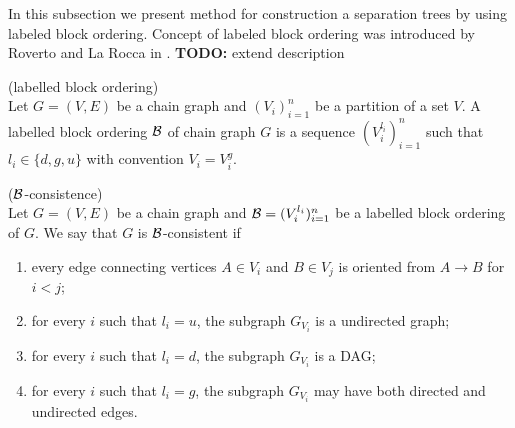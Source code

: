 %
%


In this subsection we present method for construction a separation trees by using labeled block ordering.
Concept of labeled block ordering was introduced by Roverto and La Rocca in \cite{LBO}.  
\textbf{TODO:} extend description  


\begin{defi} (labelled block ordering) \\ 
	Let $G = (V, E)$ be a chain graph and $(V_i)_{i = 1}^{n}$ be a partition of a set $V$. A labelled block ordering 
	$\mathcal{B}$ of chain graph $G$ is a sequence $(V_i^{l_i})_{i = 1}^{n}$ such that $l_i \in \{d, g, u\}$ with convention $V_i = V_i^{g}$.
\end{defi}


\begin{defi} ($\mathcal{B}$-consistence) \\ 
	Let $G = (V, E)$ be a chain graph and $\mathcal{B} = (V_i^{l_i})_{i = 1}^{n}$ be a labelled block ordering of $G$. We say that
	$G$ is $\mathcal{B}$-consistent if 
	
	\begin{enumerate}
		\item every edge connecting vertices $A \in V_i$ and $B \in V_j$ is oriented from $A \rightarrow B$ for $i < j$; 
		\item for every $i$ such that $l_i = u$, the subgraph $G_{V_i}$ is a undirected graph;
		\item for every $i$ such that $l_i = d$, the subgraph $G_{V_i}$ is a DAG;
		\item for every $i$ such that $l_i = g$, the subgraph $G_{V_i}$ may have both directed and undirected edges. 
	\end{enumerate}
\end{defi}

